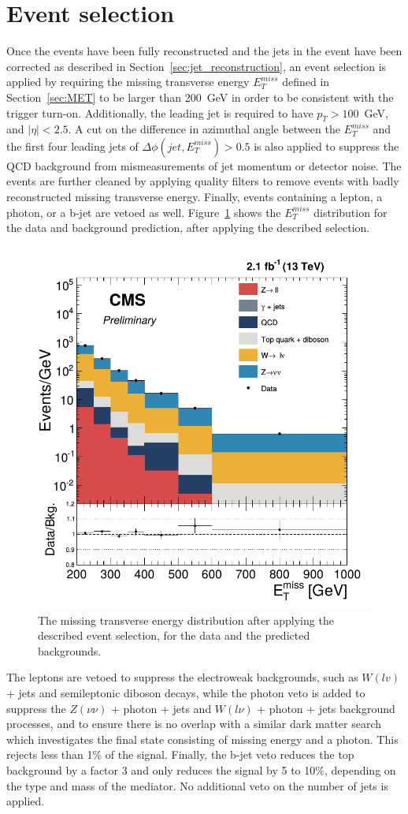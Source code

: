 \section{Event selection}
\label{sec:selection}

Once the events have been fully reconstructed and the jets in the event have been corrected as described in Section~\ref{sec:jet_reconstruction}, an event selection is applied by requiring the missing transverse energy $E_T^{miss}$ defined in Section~\ref{sec:MET} to be larger than 200~GeV in order to be consistent with the trigger turn-on. Additionally, the leading jet is required to have $p_T > 100$~GeV, and $|\eta| < 2.5$. A cut on the difference in azimuthal angle between the $E_T^{miss}$ and the first four leading jets of $\Delta\phi(jet, E_T^{miss}) > 0.5$ is also applied to suppress the QCD background from mismeasurements of jet momentum or detector noise. The events are further cleaned by applying quality filters to remove events with badly reconstructed missing transverse energy. Finally, events containing a lepton, a photon, or a b-jet are vetoed as well. Figure~\ref{fig:MET} shows the $E_T^{miss}$ distribution for the data and background prediction, after applying the described selection.

\begin{figure}[ht]
  \centering
 \includegraphics[width=.6\textwidth]{MET.png} 
 \caption{The missing transverse energy distribution after applying the described event selection, for the data and the predicted backgrounds.}
 \label{fig:MET}
\end{figure}

The leptons are vetoed to suppress the electroweak backgrounds, such as $W(lv)$ + jets and semileptonic diboson decays, while the photon veto is added to suppress the $Z(\nu\nu)$ + photon + jets and $W(l\nu)$ + photon + jets background processes, and to ensure there is no overlap with a similar dark matter search which investigates the final state consisting of missing energy and a photon. This rejects less than 1\% of the signal. Finally, the b-jet veto reduces the top background by a factor 3 and only reduces the signal by 5 to 10\%, depending on the type and mass of the mediator. No additional veto on the number of jets is applied.

